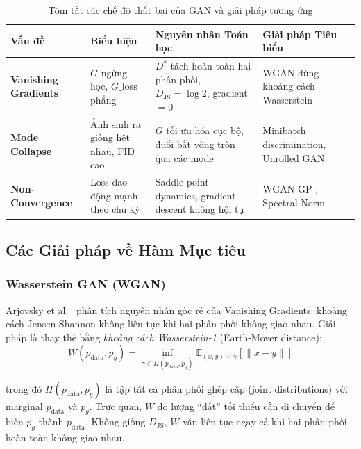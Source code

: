 \begin{longtable}{>{\bfseries}m{3.5cm} | m{4.2cm} | m{4.2cm} | m{3.1cm}}
\caption{Tóm tắt các chế độ thất bại của GAN và giải pháp tương ứng}
\label{tab:gan_failure_modes} \\
\toprule
Vấn đề & Biểu hiện & Nguyên nhân Toán học & Giải pháp Tiêu biểu \\
\midrule
\endhead
Vanishing Gradients & $G$ ngừng học, $G\_\text{loss}$ phẳng & $D^*$ tách hoàn toàn hai phân phối, $D_{\text{JS}} = \log 2$, gradient $= 0$ & WGAN \cite{Arjovsky2017} dùng khoảng cách Wasserstein \\
\midrule
Mode Collapse & Ảnh sinh ra giống hệt nhau, FID cao & $G$ tối ưu hóa cục bộ, đuổi bắt vòng tròn qua các mode & Minibatch discrimination, Unrolled GAN \cite{Salimans2016} \\
\midrule
Non-Convergence & Loss dao động mạnh theo chu kỳ & Saddle-point dynamics, gradient descent không hội tụ & WGAN-GP \cite{Gulrajani2017}, Spectral Norm \cite{Miyato2018} \\
\bottomrule
\end{longtable}


\subsection{Các Giải pháp về Hàm Mục tiêu}

\subsubsection{Wasserstein GAN (WGAN)}
\label{subsubsec:wgan}

Arjovsky et al.~\cite{Arjovsky2017} phân tích nguyên nhân gốc rễ của Vanishing Gradients: khoảng cách Jensen-Shannon không liên tục khi hai phân phối không giao nhau. Giải pháp là thay thế bằng \textit{khoảng cách Wasserstein-1} (Earth-Mover distance):
\begin{equation}
\label{eq:wasserstein}
W(p_{\text{data}}, p_g) = \inf_{\gamma \in \Pi(p_{\text{data}}, p_g)} \mathbb{E}_{(x,y) \sim \gamma} \left[ \|x - y\| \right]
\end{equation}

\noindent trong đó $\Pi(p_{\text{data}}, p_g)$ là tập tất cả phân phối ghép cặp (joint distributions) với marginal $p_{\text{data}}$ và $p_g$. Trực quan, $W$ đo lượng ``đất'' tối thiểu cần di chuyển để biến $p_g$ thành $p_{\text{data}}$. Không giống $D_{\text{JS}}$, $W$ vẫn liên tục ngay cả khi hai phân phối hoàn toàn không giao nhau.

